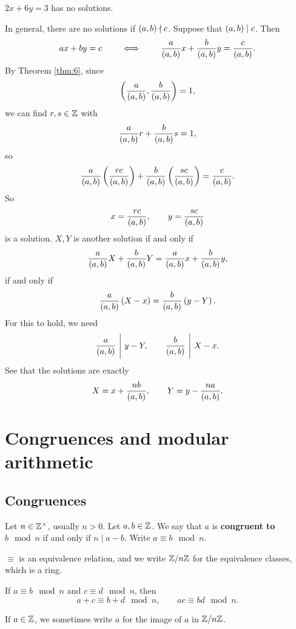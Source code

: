 \begin{example*}
$ 2x + 6y = 3 $ has no solutions.
\end{example*}

In general, there are no solutions if $ \br{a, b} \nmid c $. Suppose that $ \br{a, b} \mid c $. Then
$$ ax + by = c \qquad \iff \qquad \dfrac{a}{\br{a, b}}x + \dfrac{b}{\br{a, b}}y = \dfrac{c}{\br{a, b}}. $$
By Theorem \ref{thm:6}, since
$$ \br{\dfrac{a}{\br{a, b}}, \dfrac{b}{\br{a, b}}} = 1, $$
we can find $ r, s \in \mathbb{Z} $ with
$$ \dfrac{a}{\br{a, b}}r + \dfrac{b}{\br{a, b}}s = 1, $$
so
$$ \dfrac{a}{\br{a, b}}\br{\dfrac{rc}{\br{a, b}}} + \dfrac{b}{\br{a, b}}\br{\dfrac{sc}{\br{a, b}}} = \dfrac{c}{\br{a, b}}. $$
So
$$ x = \dfrac{rc}{\br{a, b}}, \qquad y = \dfrac{sc}{\br{a, b}} $$
is a solution.
$ X, Y $ is another solution if and only if
$$ \dfrac{a}{\br{a, b}}X + \dfrac{b}{\br{a, b}}Y = \dfrac{a}{\br{a, b}}x + \dfrac{b}{\br{a, b}}y, $$
if and only if
$$ \dfrac{a}{\br{a, b}}\br{X - x} = \dfrac{b}{\br{a, b}}\br{y - Y}. $$
For this to hold, we need
$$ \dfrac{a}{\br{a, b}} \ \Bigg| \ y - Y, \qquad \dfrac{b}{\br{a, b}} \ \Bigg| \ X - x. $$
See that the solutions are exactly
$$ X = x + \dfrac{nb}{\br{a, b}}, \qquad Y = y - \dfrac{na}{\br{a, b}}. $$

\pagebreak

\section{Congruences and modular arithmetic}

\subsection{Congruences}

\begin{definition}
Let $ n \in \mathbb{Z}^\times $, usually $ n > 0 $. Let $ a, b \in \mathbb{Z} $. We say that $ a $ is \textbf{congruent to $ b \mod n $} if and only if $ n \mid a - b $. Write $ a \equiv b \mod n $.
\end{definition}

$ \equiv $ is an equivalence relation, and we write $ \mathbb{Z} / n\mathbb{Z} $ for the equivalence classes, which is a ring.

\begin{example*}
If $ a \equiv b \mod n $ and $ c \equiv d \mod n $, then
$$ a + c \equiv b + d \mod n, \qquad ac \equiv bd \mod n. $$
\end{example*}

If $ a \in \mathbb{Z} $, we sometimes write $ \overline{a} $ for the image of $ a $ in $ \mathbb{Z} / n\mathbb{Z} $.

